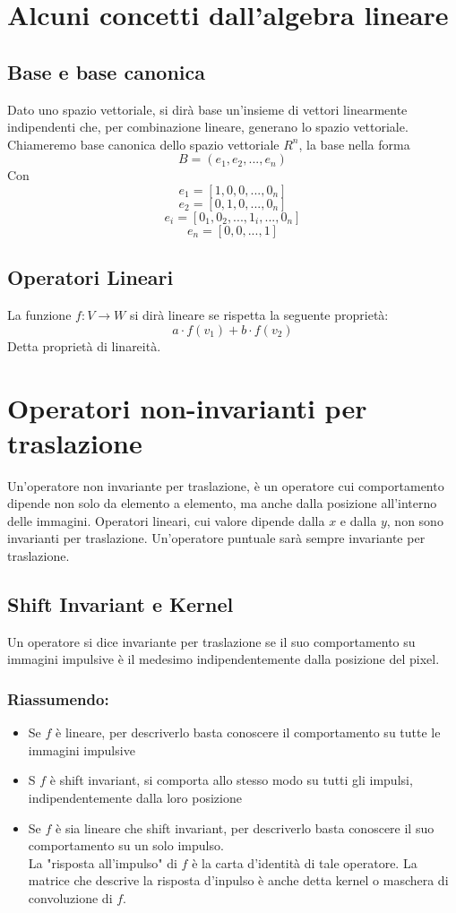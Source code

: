 \documentclass{report}
\begin{document}
	\section{Alcuni concetti dall'algebra lineare}
	\subsection{Base e base canonica}
	Dato uno spazio vettoriale, si dirà base un'insieme di vettori linearmente indipendenti che, per combinazione lineare, generano lo spazio vettoriale.
	Chiameremo base canonica dello spazio vettoriale $R^n$, la base nella forma
	$$
	B = (e_1,e_2,...,e_n)
	$$
	Con
	$$
	e_1 = [1,0,0,...,0_n]
	$$
	$$
	e_2 = [0,1,0,...,0_n]
	$$
	$$
	e_i = [0_1, 0_2, ... , 1_i, ... , 0_n]
	$$
	$$
	e_n = [0,0,..., 1]
	$$
	\subsection{Operatori Lineari}
	La funzione 
	$f:V \rightarrow W$ 
	si dirà lineare se rispetta la seguente proprietà:
	$$
	a\cdot f(v_1) + b\cdot f(v_2)
	$$
	Detta proprietà di linareità.
		
	\section{Operatori non-invarianti per traslazione}
	Un'operatore non invariante per traslazione, è un operatore cui comportamento dipende non solo da elemento a elemento, ma anche dalla posizione all'interno delle immagini.
	Operatori lineari, cui valore dipende dalla $x$ e dalla $y$, non sono invarianti per traslazione.
	Un'operatore puntuale sarà sempre invariante per traslazione.
	\subsection{Shift Invariant e Kernel}
	Un operatore si dice invariante per traslazione se il suo comportamento su immagini impulsive è il medesimo indipendentemente dalla posizione del pixel.
	\subsubsection{Riassumendo:}
	\begin{itemize}
		\item Se $f$ è lineare, per descriverlo basta conoscere il comportamento su tutte le immagini impulsive
		\item S $f$ è shift invariant, si comporta allo stesso modo su tutti gli impulsi, indipendentemente dalla loro posizione
		\item Se $f$ è sia lineare che shift invariant, per descriverlo basta conoscere il suo comportamento su un solo impulso.\\
		      La "risposta all'impulso" di $f$ è la carta d'identità di tale operatore. La matrice che descrive la risposta d'inpulso è anche detta kernel o maschera di convoluzione di $f$.
	\end{itemize}
\end{document}
